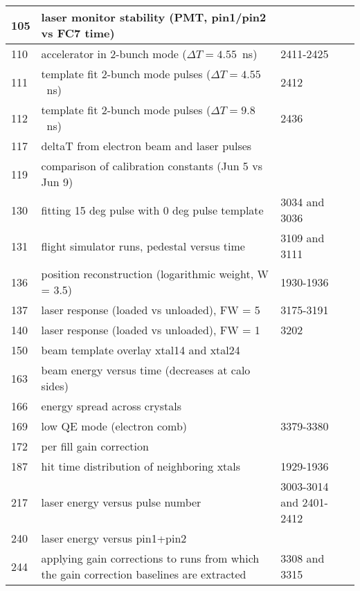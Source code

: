 \begin{longtable}{|p{2.5cm}|p{8cm}|p{4cm}|}
105 & laser monitor stability (PMT, pin1/pin2 vs FC7 time) & \\ \hline
110 & accelerator in 2-bunch mode ($\Delta T = 4.55$~ns) & 2411-2425 \\ \hline
111 & template fit 2-bunch mode pulses  ($\Delta T = 4.55$~ns) & 2412 \\ \hline
112 & template fit 2-bunch mode pulses  ($\Delta T = 9.8$~ns) & 2436 \\ \hline
117 & deltaT from electron beam and laser pulses & \\ \hline
119 & comparison of calibration constants (Jun 5 vs Jun 9) & \\ \hline
130 & fitting 15 deg pulse with 0 deg pulse template & 3034 and 3036 \\ \hline
131 & flight simulator runs, pedestal versus time & 3109 and 3111 \\ \hline
136 & position reconstruction (logarithmic weight, W = 3.5) & 1930-1936 \\ \hline
137 & laser response (loaded vs unloaded), FW = 5 & 3175-3191 \\ \hline
140 & laser response (loaded vs unloaded), FW = 1 & 3202 \\ \hline
150 & beam template overlay xtal14 and xtal24 & \\ \hline
163 & beam energy versus time (decreases at calo sides) & \\ \hline
166 & energy spread across crystals & \\ \hline
169 & low QE mode (electron comb) & 3379-3380 \\ \hline
172 & per fill gain correction &  \\ \hline
187 & hit time distribution of neighboring xtals & 1929-1936 \\ \hline
217 & laser energy versus pulse number & 3003-3014 and 2401-2412 \\ \hline
240 & laser energy versus pin1+pin2 & \\ \hline
244 & applying gain corrections to runs from which the gain correction baselines are extracted & 3308 and 3315 \\ \hline
\end{longtable}
